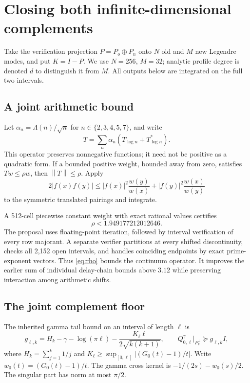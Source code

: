 \documentclass[11pt]{article}
\theoremstyle{remark}\newtheorem{remark}[theorem]{Remark}
\newcommand{\norm}[1]{\left\|#1\right\|}
\begin{document}
\section{Closing both infinite-dimensional complements}\label{sec:complement}

Take the verification projection $P=P_o\oplus P_n$ onto $N$ old and $M$ new Legendre modes, and put $K=I-P$. We use $N=256$, $M=32$; analytic profile degree is denoted $d$ to distinguish it from $M$. All outputs below are integrated on the full two intervals.

\subsection{A joint arithmetic bound}
Let $\alpha_n=\Lambda(n)/\sqrt n$ for $n\in\{2,3,4,5,7\}$, and write
\[
 T=\sum_n\alpha_n(T_{\log n}+T_{\log n}^*).
\]
This operator preserves nonnegative functions; it need not be positive as a quadratic form. If a bounded positive weight, bounded away from zero, satisfies $Tw\le\rho w$, then $\norm T\le\rho$. Apply
\[
 2|f(x)f(y)|\le |f(x)|^2\frac{w(y)}{w(x)}+|f(y)|^2\frac{w(x)}{w(y)}
\]
to the symmetric translated pairings and integrate.

A 512-cell piecewise constant weight with exact rational values certifies
\begin{equation}\label{eq:rho}
 \rho<1.949177212012646.
\end{equation}
The proposal uses floating-point iteration, followed by interval verification of every row majorant. A separate verifier partitions at every shifted discontinuity, checks all 2,152 open intervals, and handles coinciding endpoints by exact prime-exponent vectors. Thus \eqref{eq:rho} bounds the continuum operator. It improves the earlier sum of individual delay-chain bounds above $3.12$ while preserving interaction among arithmetic shifts.

\subsection{The joint complement floor}
The inherited gamma tail bound on an interval of length $\ell$ is
\[
 g_{\ell,k}=H_k-\gamma-\log(\pi\ell)
 -\frac{K_\ell\ell}{2\sqrt{k(k+1)}},\qquad
 Q^\gamma_{0,\ell}\big|_{P_k^\perp}\succeq g_{\ell,k}I,
\]
where $H_k=\sum_{j=1}^k1/j$ and $K_\ell\ge\sup_{[0,\ell]}|(G_0(t)-1)/t|$. Write $w_0(t)=(G_0(t)-1)/t$. The gamma cross kernel is $-1/(2s)-w_0(s)/2$. The singular part has norm at most $\pi/2$.
\end{document}
